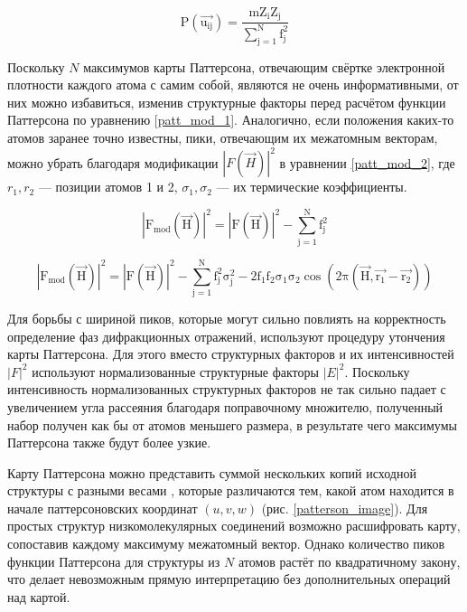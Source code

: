 \begin{equation}
	\mathrm{P(\overrightarrow{u_{ij}}) = \frac{mZ_iZ_j}{\sum\limits_{j=1}^N f_j^2} }
\end{equation}

Поскольку $N$ максимумов карты Паттерсона, отвечающим свёртке электронной плотности каждого атома с самим собой, являются не очень информативными, от них можно избавиться, изменив структурные факторы перед расчётом функции Паттерсона по уравнению \ref{patt_mod_1}. Аналогично, если положения каких-то атомов заранее точно известны, пики, отвечающим их межатомным векторам, можно убрать благодаря модификации $|F(\overrightarrow{H})|^2$ в уравнении \ref{patt_mod_2}, где $r_1, r_2$ --- позиции атомов 1 и 2, $\sigma_1, \sigma_2$ --- их термические коэффициенты.

\begin{equation}\label{patt_mod_1}
	\mathrm{|F_{mod}(\overrightarrow{H})|^2 = |F(\overrightarrow{H})|^2 - \sum\limits_{j=1}^Nf_j^2}
\end{equation}

\begin{equation}\label{patt_mod_2}
	\mathrm{|F_{mod}(\overrightarrow{H})|^2 = |F(\overrightarrow{H})|^2 - \sum\limits_{j=1}^Nf_j^2\sigma_j^2-2f_1f_2\sigma_1\sigma_2\cos(2\pi (\overrightarrow{H},\overrightarrow{r_1}-\overrightarrow{r_2}))}
\end{equation}

Для борьбы с шириной пиков, которые могут сильно повлиять на корректность определение фаз дифракционных отражений, используют процедуру утончения карты Паттерсона. Для этого вместо структурных факторов и их интенсивностей $|F|^2$ используют нормализованные структурные факторы $|E|^2$. Поскольку интенсивность нормализованных структурных факторов не так сильно падает с увеличением угла рассеяния благодаря поправочному множителю, полученный набор получен как бы от атомов меньшего размера, в результате чего максимумы Паттерсона также будут более узкие.

Карту Паттерсона можно представить суммой нескольких копий исходной структуры с разными весами \cite{buerger_solution_1953}, которые различаются тем, какой атом находится в начале паттерсоновских координат $(u, v, w)$ (рис. \ref{patterson_image}). Для простых структур низкомолекулярных соединений возможно расшифровать карту, сопоставив каждому максимуму межатомный вектор. Однако количество пиков функции Паттерсона для структуры из $N$ атомов растёт по квадратичному закону, что делает невозможным прямую интерпретацию без дополнительных операций над картой.

